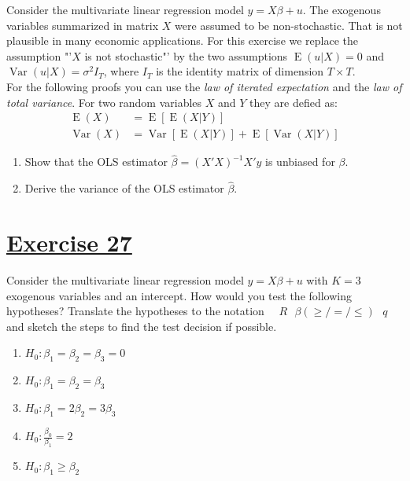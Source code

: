 \documentclass[captions=tableheading, 12pt, headings=small, parskip=half]{scrartcl}
\begin{document}
Consider the multivariate linear regression model $y = X\beta + u$. The exogenous variables summarized in matrix $X$ were assumed to be non-stochastic. That is not plausible in many economic applications. For this exercise we replace the assumption "'$X$ is not stochastic"' by the two assumptions $\operatorname{E}(u|X)=0$ and $\operatorname{Var}(u|X) = \sigma^2I_T$, where $I_T$ is the identity matrix of dimension $T\times T$.\\
For the following proofs you can use the \textit{law of iterated expectation} and the \textit{law of total variance}. For two random variables $X$ and $Y$ they are defied as:
\begin{align*}
	\operatorname{E}(X) &= \operatorname{E}\left[\operatorname{E}\left(X|Y\right)\right]\\
	\operatorname{Var}(X) &= \operatorname{Var}\left[\operatorname{E}\left(X|Y\right)\right] + \operatorname{E}\left[\operatorname{Var}\left(X|Y\right)\right]
\end{align*}
\begin{enumerate}[label = \alph*)]
	\item Show that the OLS estimator $\hat{\beta} = (X'X)^{-1}X'y$ is unbiased for $\beta$.
	\item Derive the variance of the OLS estimator $\hat{\beta}$.
\end{enumerate}

\newpage
\section*{\underline{Exercise 27}}
Consider the multivariate linear regression model $y = X\beta + u$ with $K = 3$ exogenous variables and an intercept. How would you test the following hypotheses? Translate the hypotheses to the notation $\quad R\text{ }\beta (\ge/ = / \le)\text{ }q \quad$ and sketch the steps to find the test decision if possible.
\begin{enumerate}[label = \alph*)]
	\item $H_0: \beta_1 = \beta_2 = \beta_3 = 0$
	\item $H_0: \beta_1 = \beta_2 = \beta_3$
	\item $H_0: \beta_1 = 2\beta_2 = 3\beta_3$
	\item $H_0: \frac{\beta_0}{\beta_1} = 2$
	\item $H_0: \beta_1 \ge \beta_2$
\end{enumerate}
\end{document}
